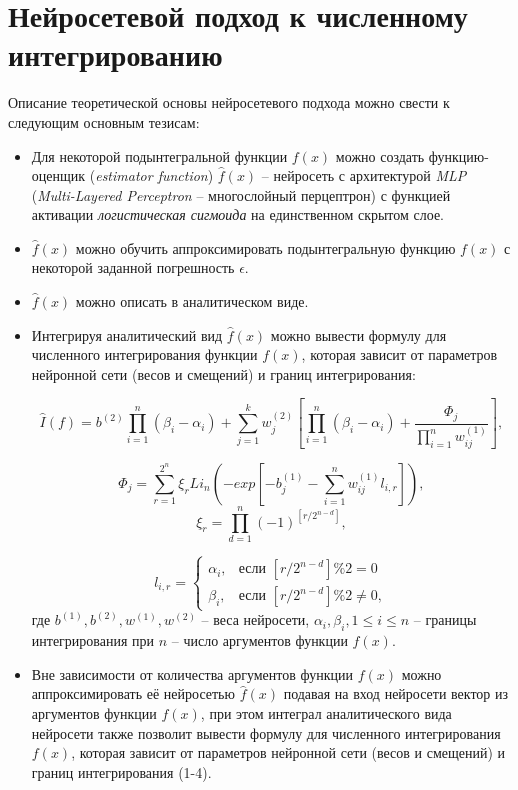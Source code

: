 \documentclass[a4paper,12pt]{article} %
\begin{document}
\section{Нейросетевой подход к численному интегрированию}

Описание теоретической основы нейросетевого подхода можно свести к следующим основным тезисам:

\begin{itemize}
    \item Для некоторой подынтегральной функции $ f(x) $ можно создать функцию-оценщик (\textit{estimator function}) $ \hat{f}(x) $ -- нейросеть с архитектурой \textit{MLP} (\textit{Multi-Layered Perceptron} -- многослойный перцептрон) с функцией активации \textit{логистическая сигмоида} на единственном скрытом слое.
    \item $ \hat{f}(x) $ можно обучить аппроксимировать подынтегральную функцию $ f(x) $ с некоторой заданной погрешность $ \epsilon $.
    \item $ \hat{f}(x) $ можно описать в аналитическом виде.
    \item Интегрируя аналитический вид $ \hat{f}(x) $ можно вывести формулу для численного интегрирования функции $ f(x) $, которая зависит от параметров нейронной сети (весов и смещений) и границ интегрирования:

\begin{equation}
    \hat{I}(f) = b^{(2)}\prod_{i=1}^{n}(\beta_i - \alpha_i) + \sum_{j=1}^{k}w_j^{(2)}[\prod_{i=1}^{n}(\beta_i - \alpha_i) + \frac{\Phi_j}{\prod_{i=1}^{n}w_{ij}^{(1)}}],
\end{equation}

\begin{equation}
    \Phi_j = \sum_{r=1}^{2^n}\xi_{r}Li_n(-exp[-b_j^{(1)} - \sum_{i=1}^{n}w_{ij}^{(1)}l_{i,r}]),
\end{equation}
\begin{equation}
    \xi_{r} = \prod_{d=1}^{n}(-1)^{[{r}/{2^{n-d}}]},
\end{equation}

\begin{equation}
    l_{i,r} = \left\{
\begin{array}{ll}
\alpha_i, & \text{если } [{r}/{2^{n-d}}] \% 2 = 0 \\
\beta_i, & \text{если } [{r}/{2^{n-d}}] \% 2 \neq 0,
\end{array}
\right.
\end{equation}
    где $b^{(1)}, b^{(2)}, w^{(1)}, w^{(2)}$ -- веса нейросети, $\alpha_i, \beta_i, 1 \leq i \leq n$ -- границы интегрирования при $n$ -- число аргументов функции $ f(x) $.
    \item Вне зависимости от количества аргументов функции $ f(x) $ можно аппроксимировать её нейросетью $ \hat{f}(x) $ подавая на вход нейросети вектор из аргументов функции $ f(x) $, при этом интеграл аналитического вида нейросети также позволит вывести формулу для численного интегрирования $ f(x) $, которая зависит от параметров нейронной сети (весов и смещений) и границ интегрирования (1-4).
\end{itemize}
\end{document}
